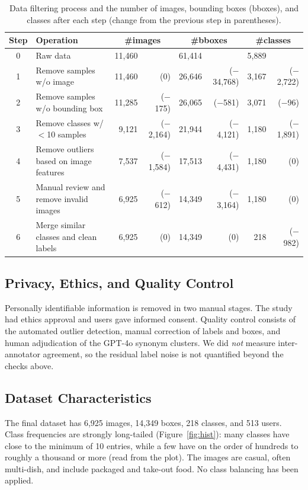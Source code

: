 \documentclass[sigconf, nonacm]{acmart}
\begin{document}
\begin{table}[t]
  \centering
  \small
  \caption{Data filtering process and the number of images, bounding boxes (bboxes), and classes after each step (change from the previous step in parentheses).}
  \begin{tabular}{@{}cl rr rr rr@{}}
    \toprule
    Step & Operation & \multicolumn{2}{c}{\#images} & \multicolumn{2}{c}{\#bboxes} & \multicolumn{2}{c}{\#classes} \\
    \midrule
    0 & Raw data & 11,460 & & 61,414 & & 5,889 & \\
    1 & Remove samples w/o image & 11,460 & (0) & 26,646 & ($-$34,768) & 3,167 & ($-$2,722) \\
    2 & Remove samples w/o bounding box & 11,285 & ($-$175) & 26,065 & ($-$581) & 3,071 & ($-$96) \\
    3 & Remove classes w/ $<$10 samples & 9,121 & ($-$2,164) & 21,944 & ($-$4,121) & 1,180 & ($-$1,891) \\
    4 & Remove outliers based on image features & 7,537 & ($-$1,584) & 17,513 & ($-$4,431) & 1,180 & (0) \\
    5 & Manual review and remove invalid images & 6,925 & ($-$612) & 14,349 & ($-$3,164) & 1,180 & (0) \\
    6 & Merge similar classes and clean labels & 6,925 & (0) & 14,349 & (0) & 218 & ($-$982) \\
    \bottomrule
  \end{tabular}
  \label{tab:filtering}
\end{table}

\subsection{Privacy, Ethics, and Quality Control}
Personally identifiable information is removed in two manual stages. The study had ethics approval and users gave informed consent. Quality control consists of the automated outlier detection, manual correction of labels and boxes, and human adjudication of the GPT-4o synonym clusters. We did \emph{not} measure inter-annotator agreement, so the residual label noise is not quantified beyond the checks above.

\subsection{Dataset Characteristics}
The final dataset has 6,925 images, 14,349 boxes, 218 classes, and 513 users. Class frequencies are strongly long-tailed (Figure~\ref{fig:hist}): many classes have close to the minimum of 10 entries, while a few have on the order of hundreds to roughly a thousand or more (read from the plot). The images are casual, often multi-dish, and include packaged and take-out food. No class balancing has been applied.
\end{document}
